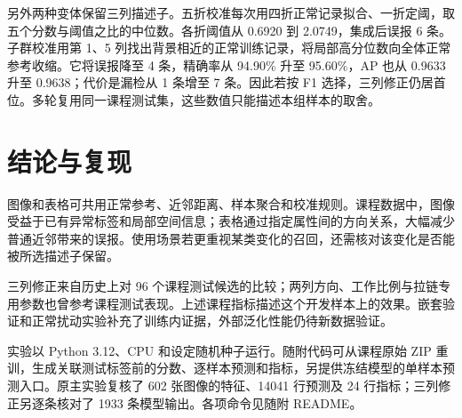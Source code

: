 \documentclass[sigconf,nonacm,screen]{acmart}
\begin{document}
另外两种变体保留三列描述子。五折校准每次用四折正常记录拟合、一折定阈，取五个分数与阈值之比的中位数。各折阈值从 0.6920 到 2.0749，集成后误报 6 条。子群校准用第 1、5 列找出背景相近的正常训练记录，将局部高分位数向全体正常参考收缩。它将误报降至 4 条，精确率从 94.90\% 升至 95.60\%，AP 也从 0.9633 升至 0.9638；代价是漏检从 1 条增至 7 条。因此若按 F1 选择，三列修正仍居首位。多轮复用同一课程测试集，这些数值只能描述本组样本的取舍。

\section{结论与复现}
图像和表格可共用正常参考、近邻距离、样本聚合和校准规则。课程数据中，图像受益于已有异常标签和局部空间信息；表格通过指定属性间的方向关系，大幅减少普通近邻带来的误报。使用场景若更重视某类变化的召回，还需核对该变化是否能被所选描述子保留。

三列修正来自历史上对 96 个课程测试候选的比较；两列方向、工作比例与拉链专用参数也曾参考课程测试表现。上述课程指标描述这个开发样本上的效果。嵌套验证和正常扰动实验补充了训练内证据，外部泛化性能仍待新数据验证。

实验以 Python 3.12、CPU 和设定随机种子运行。随附代码可从课程原始 ZIP 重训，生成关联测试标签前的分数、逐样本预测和指标，另提供冻结模型的单样本预测入口。原主实验复核了 602 张图像的特征、14041 行预测及 24 行指标；三列修正另逐条核对了 1933 条模型输出。各项命令见随附 README。
\FloatBarrier


\end{document}
